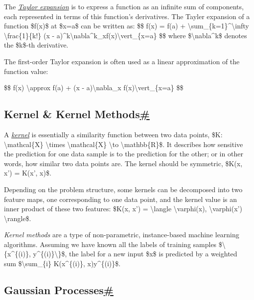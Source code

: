 The \href{https://en.wikipedia.org/wiki/Taylor_series}{\emph{Taylor expansion}} is to express a function as an infinite sum of components, each represented in terms of this function's derivatives. The Tayler expansion of a function \$f(x)\$ at \$x=a\$ can be written as: \$\$ f(x) = f(a) + \textbackslash sum\_\{k=1\}\^{}\textbackslash infty \textbackslash frac\{1\}\{k!\} (x - a)\^{}k\textbackslash nabla\^{}k\_xf(x)\textbackslash vert\_\{x=a\} \$\$ where \$\textbackslash nabla\^{}k\$ denotes the \$k\$-th derivative.

The first-order Taylor expansion is often used as a linear approximation of the function value:

\$\$ f(x) \textbackslash approx f(a) + (x - a)\textbackslash nabla\_x f(x)\textbackslash vert\_\{x=a\} \$\$

\subsection{\texorpdfstring{Kernel \& Kernel Methods\hyperref[kernel--kernel-methods]{\#}}{Kernel \& Kernel Methods\#}}\label{kernel--kernel-methods}

A \href{https://en.wikipedia.org/wiki/Kernel_method}{\emph{kernel}} is essentially a similarity function between two data points, \$K: \textbackslash mathcal\{X\} \textbackslash times \textbackslash mathcal\{X\} \textbackslash to \textbackslash mathbb\{R\}\$. It describes how sensitive the prediction for one data sample is to the prediction for the other; or in other words, how similar two data points are. The kernel should be symmetric, \$K(x, x') = K(x', x)\$.

Depending on the problem structure, some kernels can be decomposed into two feature maps, one corresponding to one data point, and the kernel value is an inner product of these two features: \$K(x, x') = \textbackslash langle \textbackslash varphi(x), \textbackslash varphi(x') \textbackslash rangle\$.

\emph{Kernel methods} are a type of non-parametric, instance-based machine learning algorithms. Assuming we have known all the labels of training samples \$\textbackslash\{x\^{}\{(i)\}, y\^{}\{(i)\}\textbackslash\}\$, the label for a new input \$x\$ is predicted by a weighted sum \$\textbackslash sum\_\{i\} K(x\^{}\{(i)\}, x)y\^{}\{(i)\}\$.

\subsection{\texorpdfstring{Gaussian Processes\hyperref[gaussian-processes]{\#}}{Gaussian Processes\#}}\label{gaussian-processes}


